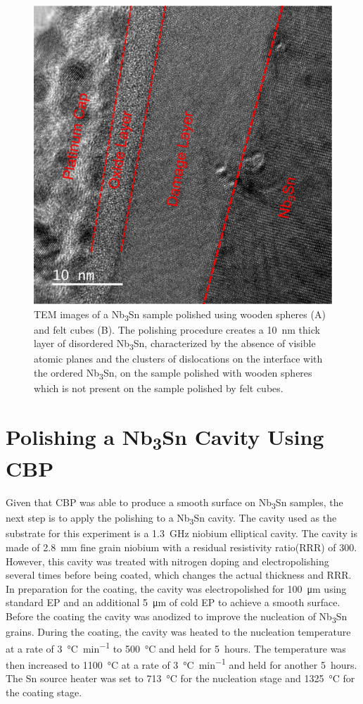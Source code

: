 \documentclass[reprint,amsmath,amssymb,aps]{revtex4-2}%
\begin{document}
%


\begin{figure}[t]%
\centering%
\includegraphics[width=0.8\columnwidth]{../doc/figs/Sample_Surface_Damage_Layer.png}%
\caption{TEM images of a Nb\textsubscript{3}Sn sample polished using wooden spheres (A) and felt cubes (B). The polishing procedure creates a 10~nm thick layer of disordered Nb\textsubscript{3}Sn, characterized by the absence of visible atomic planes and the clusters of dislocations on the interface with the ordered Nb\textsubscript{3}Sn, on the sample polished with wooden spheres which is not present on the sample polished by felt cubes.}%
\label{fig:samplesurfacedamagelayer}%
\end{figure}

%
\section{Polishing a Nb\textsubscript{3}Sn Cavity Using CBP}%
\label{sec:cavitycbp}%
Given that CBP was able to produce a smooth surface on Nb\textsubscript{3}Sn samples, the next step is to apply the polishing to a Nb\textsubscript{3}Sn cavity. The cavity used as the substrate for this experiment is a 1.3~GHz niobium elliptical cavity. The cavity is made of 2.8~mm fine grain niobium with a residual resistivity ratio(RRR) of 300. However, this cavity was treated with nitrogen doping and electropolishing several times before being coated, which changes the actual thickness and RRR. In preparation for the coating, the cavity was electropolished for 100~\unit{\micro\metre} using standard EP and an additional 5~\unit{\micro\metre} of cold EP to achieve a smooth surface. Before the coating the cavity was anodized to improve the nucleation of Nb\textsubscript{3}Sn grains. During the coating, the cavity was heated to the nucleation temperature at a rate of 3~\unit{\celsius\per\minute} to 500~°C and held for 5~hours. The temperature was then increased to 1100~°C at a rate of 3~\unit{\celsius\per\minute} and held for another 5~hours. The Sn source heater was set to 713~°C for the nucleation stage and 1325~°C for the coating stage.
\end{document}
